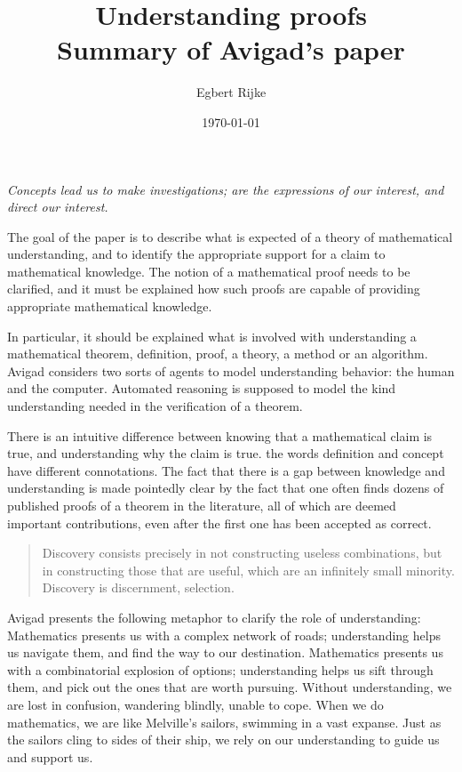 \documentclass{article}
\title{{\sc Understanding proofs}\\{\footnotesize Summary of Avigad's paper}}
\author{Egbert Rijke}
\date\today
\begin{document}
\maketitle

\hfill
\begin{minipage}{.4\textwidth}
\sl
Concepts lead us to make investigations; are the expressions of our interest,
and direct our interest.
\end{minipage}

\vspace{3\baselineskip}

The goal of the paper is to describe what is expected of a theory of 
mathematical understanding, and to identify the appropriate support for a claim
to mathematical knowledge. The notion of a mathematical proof needs to be
clarified, and it must be explained how such proofs are capable of providing
appropriate mathematical knowledge. 

In particular, it should be explained what is 
involved with understanding a mathematical theorem, definition, proof, a theory,
a method or an algorithm. Avigad considers two sorts of agents to model 
understanding behavior: the human and the computer. Automated reasoning is 
supposed to model the kind understanding needed in the verification of a 
theorem.

There is an intuitive difference between knowing that a mathematical claim is
true, and understanding why the claim is true. the words definition and concept
have different connotations. The fact that there is a gap between knowledge and
understanding is made pointedly clear by the fact that one often finds dozens
of published proofs of a theorem in the literature, all of which are deemed
important contributions, even after the first one has been accepted as correct.

\begin{quote}
Discovery consists precisely in not constructing useless combinations, but in
constructing those that are useful, which are an infinitely small minority.
Discovery is discernment, selection.
\end{quote}

Avigad presents the following metaphor to clarify the role of understanding:
Mathematics presents us with a complex network of roads; understanding
helps us navigate them, and find the way to our destination. Mathematics
presents us with a combinatorial explosion of options; understanding helps us
sift through them, and pick out the ones that are worth pursuing. Without
understanding, we are lost in confusion, wandering blindly, unable to cope.
When we do mathematics, we are like Melville's sailors, swimming in a vast
expanse. Just as the sailors cling to sides of their ship, we rely on our
understanding to guide us and support us.
\end{document}
